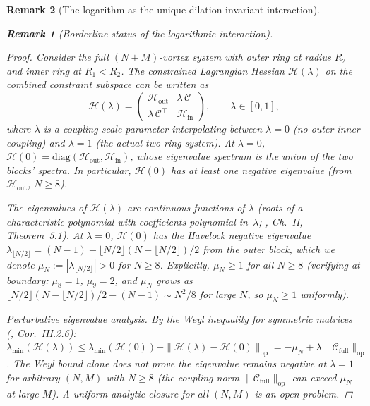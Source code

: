 \documentclass[12pt, a4paper]{article}
\newtheorem{remark}{Remark}[section]
\numberwithin{equation}{section}
\begin{document}
\begin{remark}[The logarithm as the unique dilation-invariant interaction]
\begin{remark}[Borderline status of the logarithmic interaction]
\begin{proof}
Consider the full $(N{+}M)$-vortex system with outer ring
at radius $R_2$ and inner ring at $R_1 < R_2$.
The constrained Lagrangian Hessian $\mathcal{H}(\lambda)$
on the combined constraint subspace can be written as
\[
  \mathcal{H}(\lambda) = \begin{pmatrix}
    \mathcal{H}_{\mathrm{out}} & \lambda\,\mathcal{C} \\
    \lambda\,\mathcal{C}^\top & \mathcal{H}_{\mathrm{in}}
  \end{pmatrix},
  \qquad \lambda \in [0, 1],
\]
where $\lambda$ is a coupling-scale parameter interpolating
between $\lambda = 0$ (no outer-inner coupling) and $\lambda = 1$
(the actual two-ring system).  At $\lambda = 0$,
$\mathcal{H}(0) = \mathrm{diag}(\mathcal{H}_{\mathrm{out}},
\mathcal{H}_{\mathrm{in}})$, whose eigenvalue spectrum is the
union of the two blocks' spectra.  In particular,
$\mathcal{H}(0)$ has at least one negative eigenvalue
(from $\mathcal{H}_{\mathrm{out}}$, $N \ge 8$).

The eigenvalues of $\mathcal{H}(\lambda)$ are continuous
functions of $\lambda$ (roots of a characteristic polynomial
with coefficients polynomial in~$\lambda$;
\citealt{Kato1995}, Ch.~II, Theorem~5.1).  At $\lambda = 0$,
$\mathcal{H}(0)$ has the Havelock negative eigenvalue
$\lambda_{\lfloor N/2\rfloor} = (N{-}1) - \lfloor N/2\rfloor
(N{-}\lfloor N/2\rfloor)/2$ from the outer block, which we denote
$\mu_N := |\lambda_{\lfloor N/2\rfloor}| > 0$ for $N \ge 8$.
Explicitly, $\mu_N \ge 1$ for all $N \ge 8$
(verifying at boundary: $\mu_8 = 1$, $\mu_9 = 2$, and
$\mu_N$ grows as $\lfloor N/2\rfloor(N{-}\lfloor N/2\rfloor)/2 - (N{-}1)
\sim N^2/8$ for large $N$, so $\mu_N \ge 1$ uniformly).

\emph{Perturbative eigenvalue analysis.}
By the Weyl inequality for symmetric matrices
(\citealt{BhatiaMatrixAnalysis1997}, Cor.~III.2.6):
$\lambda_{\min}(\mathcal{H}(\lambda))
\le \lambda_{\min}(\mathcal{H}(0)) + \|\mathcal{H}(\lambda)
- \mathcal{H}(0)\|_{\mathrm{op}}
= -\mu_N + \lambda\|\mathcal{C}_{\mathrm{full}}\|_{\mathrm{op}}$.
The Weyl bound alone does not prove the eigenvalue remains
negative at $\lambda = 1$ for arbitrary $(N, M)$ with $N \ge 8$
(the coupling norm $\|\mathcal{C}_{\mathrm{full}}\|_{\mathrm{op}}$
can exceed $\mu_N$ at large $M$).
A uniform analytic closure for all $(N, M)$ is an open problem.


\end{proof}
\end{remark}
\end{remark}
\end{document}
